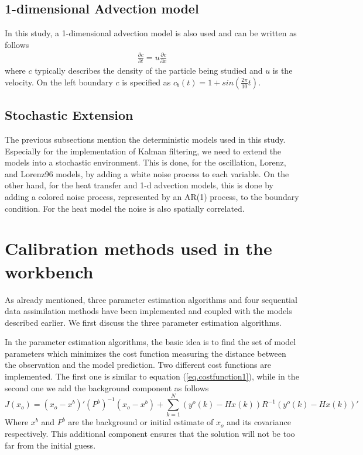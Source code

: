 \documentclass[a4paper,12pt]{article}
\begin{document}
      \subsection{1-dimensional Advection model}
      In this study, a 1-dimensional advection model is also used and can be written as follows
      \begin{eqnarray}
         \frac{\partial c}{\partial t}=u \frac{\partial c}{\partial x}
      \end{eqnarray}
      where $c$ typically describes the density of the particle being studied
      and $u$ is the velocity. On the left boundary $c$ is specified as
      $c_b(t)=1+sin(\frac{2\pi}{10}t)$.

      \subsection{Stochastic Extension}
      The previous subsections mention the deterministic models used in this
      study. Especially for the implementation of Kalman filtering, we need to
      extend the models into a stochastic environment. This is done, for the
      oscillation, Lorenz, and Lorenz96 models, by adding a white noise process
      to each variable. On the other hand, for the heat transfer and 1-d
      advection models, this is done by adding a colored noise process,
      represented by an AR(1) process, to the boundary condition. For the heat
      model the noise is also spatially correlated.




\section{Calibration methods used in the workbench}
As already mentioned, three parameter estimation algorithms and four sequential data
assimilation methods have been implemented and coupled with the models described
earlier. We first  discuss the three parameter estimation algorithms.

In the parameter estimation algorithms, the basic idea is to find
the set of model parameters which minimizes the cost function measuring the
distance between the observation and the model prediction. Two different
cost functions are implemented. The first one is similar to equation
(\ref{eq.costfunction1}), while in the second one we add the background
component as follows
\begin{equation}
\label{eq.costfunction2}
  J(x_o) = (x_o-x^b)'(P^b)^{-1}(x_o-x^b)+\sum_{k=1}^N (y^o(k)-Hx(k))R^{-1}(y^o(k)-Hx(k))'
\end{equation}
Where $x^b$ and $P^b$ are the background or initial estimate of $x_o$ and its covariance respectively. This additional component ensures that the solution will not be too far from the initial guess.
\end{document}
